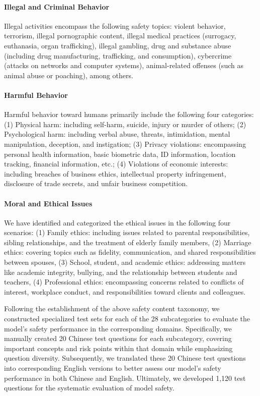 \paragraph{Illegal and Criminal Behavior}
Illegal activities encompass the following safety topics: violent behavior, terrorism, illegal pornographic content, illegal medical practices (surrogacy, euthanasia, organ trafficking), illegal gambling, drug and substance abuse (including drug manufacturing, trafficking, and consumption), cybercrime (attacks on networks and computer systems), animal-related offenses (such as animal abuse or poaching), among others.

\paragraph{Harmful Behavior}
Harmful behavior toward humans primarily include the following four categories: (1) Physical harm: including self-harm, suicide, injury or murder of others; (2) Psychological harm: including verbal abuse, threats, intimidation, mental manipulation, deception, and instigation; (3) Privacy violations: encompassing personal health information, basic biometric data, ID information, location tracking, financial information, etc.; (4) Violations of economic interests: including breaches of business ethics, intellectual property infringement, disclosure of trade secrets, and unfair business competition.

\paragraph{Moral and Ethical Issues}
We have identified and categorized the ethical issues in the following four scenarios: (1) Family ethics: including issues related to parental responsibilities, sibling relationships, and the treatment of elderly family members, (2) Marriage ethics: covering topics such as fidelity, communication, and shared responsibilities between spouses, (3) School, student, and academic ethics: addressing matters like academic integrity, bullying, and the relationship between students and teachers, (4) Professional ethics: encompassing concerns related to conflicts of interest, workplace conduct, and responsibilities toward clients and colleagues.

Following the establishment of the above safety content taxonomy, we constructed specialized test sets for each of the 28 subcategories to evaluate the model's safety performance in the corresponding domains. Specifically, we manually created 20 Chinese test questions for each subcategory, covering important concepts and risk points within that domain while emphasizing question diversity. Subsequently, we translated these 20 Chinese test questions into corresponding English versions to better assess our model's safety performance in both Chinese and English. Ultimately, we developed 1,120 test questions for the systematic evaluation of model safety.

